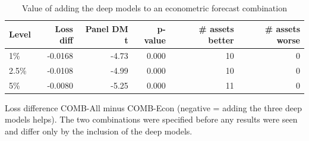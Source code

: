 \begin{table}[htbp]
\centering
\footnotesize
\caption{Value of adding the deep models to an econometric forecast combination}
\label{tab:combo}
\begin{tabular}{lrrrrr}
\toprule
Level & Loss diff & Panel DM t & p-value & \# assets better & \# assets worse \\
\midrule
1\% & -0.0168 & -4.73 & 0.000 & 10 & 0 \\
2.5\% & -0.0108 & -4.99 & 0.000 & 10 & 0 \\
5\% & -0.0080 & -5.25 & 0.000 & 11 & 0 \\
\bottomrule
\end{tabular}
\par\smallskip\parbox{\linewidth}{\scriptsize Loss difference COMB-All minus COMB-Econ (negative = adding the three deep models helps). The two combinations were specified before any results were seen and differ only by the inclusion of the deep models.}
\end{table}